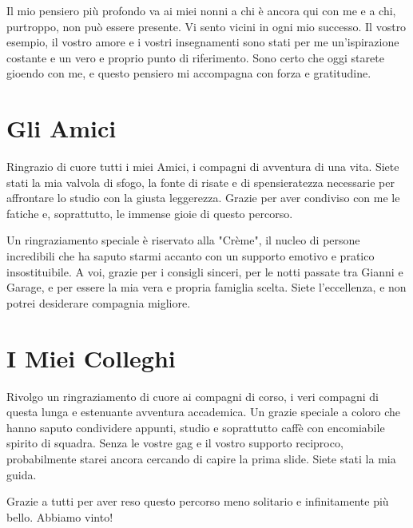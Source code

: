 \documentclass[12pt, oneside]{extbook}
\begin{document}
Il mio pensiero più profondo va ai miei nonni  a chi è ancora qui con me e a chi, purtroppo, non può essere presente. Vi sento vicini in ogni mio successo. Il vostro esempio, il vostro amore e i vostri insegnamenti sono stati per me un’ispirazione costante e un vero e proprio punto di riferimento.
Sono certo che oggi starete gioendo con me, e questo pensiero mi accompagna con forza e gratitudine.

\section*{Gli Amici}

Ringrazio di cuore tutti i miei Amici, i compagni di avventura di una vita. Siete stati la mia valvola di sfogo, la fonte di risate e di spensieratezza necessarie per affrontare lo studio con la giusta leggerezza. Grazie per aver condiviso con me le fatiche e, soprattutto, le immense gioie di questo percorso.

Un ringraziamento speciale è riservato alla "Crème", il nucleo di persone incredibili che ha saputo starmi accanto con un supporto emotivo e pratico insostituibile. A voi, grazie per i consigli sinceri, per le notti passate tra Gianni e Garage, e per essere la mia vera e propria famiglia scelta. Siete l'eccellenza, e non potrei desiderare compagnia migliore.


\section*{I Miei Colleghi}

Rivolgo un ringraziamento di cuore ai compagni di corso, i veri compagni di questa lunga e estenuante avventura accademica.
Un grazie speciale a coloro che hanno saputo condividere appunti, studio e soprattutto caffè con encomiabile spirito di squadra.
Senza le vostre gag e il vostro supporto reciproco, probabilmente starei ancora cercando di capire la prima slide. Siete stati la mia guida. 


\vspace{1cm}
Grazie a tutti per aver reso questo percorso meno solitario e infinitamente più bello.
Abbiamo vinto!
\end{document}

